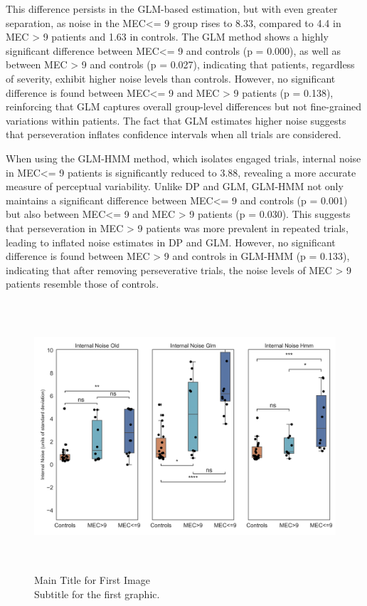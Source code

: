 This difference persists in the GLM-based estimation, but with even greater separation, as noise in the MEC<= 9 group rises to 8.33, compared to 4.4 in MEC > 9 patients and 1.63 in controls. The GLM method shows a highly significant difference between MEC<= 9 and controls (p = 0.000), as well as between MEC > 9 and controls (p = 0.027), indicating that patients, regardless of severity, exhibit higher noise levels than controls. However, no significant difference is found between MEC<= 9 and MEC > 9 patients (p = 0.138), reinforcing that GLM captures overall group-level differences but not fine-grained variations within patients. The fact that GLM estimates higher noise suggests that perseveration inflates confidence intervals when all trials are considered.

When using the GLM-HMM method, which isolates engaged trials, internal noise in MEC<= 9 patients is significantly reduced to 3.88, revealing a more accurate measure of perceptual variability. Unlike DP and GLM, GLM-HMM not only maintains a significant difference between MEC<= 9 and controls (p = 0.001) but also between MEC<= 9 and MEC > 9 patients (p = 0.030). This suggests that perseveration in MEC > 9 patients was more prevalent in repeated trials, leading to inflated noise estimates in DP and GLM. However, no significant difference is found between MEC > 9 and controls in GLM-HMM (p = 0.133), indicating that after removing perseverative trials, the noise levels of MEC > 9 patients resemble those of controls.
\begin{figure}[H]
    \centering
    \includegraphics[width=17cm,height=10cm]{MainLayout/Images/chapter8/internal_noise_types_glms.jpg}
    \caption{Main Title for First Image \\ \small Subtitle for the first graphic.}
    \label{fig:internal_noise_comparison_types_glms}
\end{figure}
